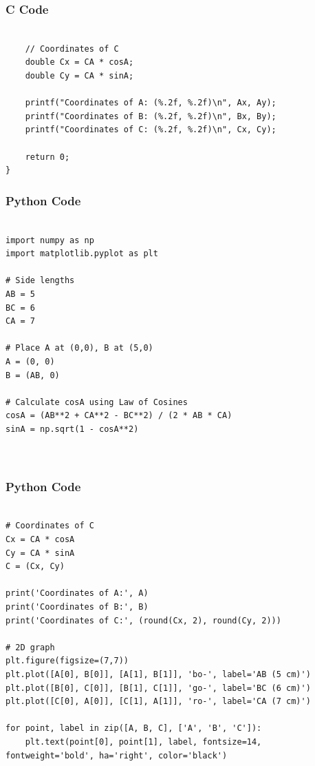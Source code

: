 \documentclass{beamer}
\begin{document}
\begin{frame}[fragile]
    \frametitle{C Code}
    \begin{lstlisting}

    // Coordinates of C
    double Cx = CA * cosA;
    double Cy = CA * sinA;

    printf("Coordinates of A: (%.2f, %.2f)\n", Ax, Ay);
    printf("Coordinates of B: (%.2f, %.2f)\n", Bx, By);
    printf("Coordinates of C: (%.2f, %.2f)\n", Cx, Cy);

    return 0;
}

    \end{lstlisting}
\end{frame}







\begin{frame}[fragile]
    \frametitle{Python Code}
    \begin{lstlisting}

import numpy as np
import matplotlib.pyplot as plt

# Side lengths
AB = 5
BC = 6
CA = 7

# Place A at (0,0), B at (5,0)
A = (0, 0)
B = (AB, 0)

# Calculate cosA using Law of Cosines
cosA = (AB**2 + CA**2 - BC**2) / (2 * AB * CA)
sinA = np.sqrt(1 - cosA**2)



    \end{lstlisting}
\end{frame}


\begin{frame}[fragile]
    \frametitle{Python Code}
    \begin{lstlisting}

# Coordinates of C
Cx = CA * cosA
Cy = CA * sinA
C = (Cx, Cy)

print('Coordinates of A:', A)
print('Coordinates of B:', B)
print('Coordinates of C:', (round(Cx, 2), round(Cy, 2)))

# 2D graph
plt.figure(figsize=(7,7))
plt.plot([A[0], B[0]], [A[1], B[1]], 'bo-', label='AB (5 cm)')
plt.plot([B[0], C[0]], [B[1], C[1]], 'go-', label='BC (6 cm)')
plt.plot([C[0], A[0]], [C[1], A[1]], 'ro-', label='CA (7 cm)')

for point, label in zip([A, B, C], ['A', 'B', 'C']):
    plt.text(point[0], point[1], label, fontsize=14, fontweight='bold', ha='right', color='black')



    \end{lstlisting}
\end{frame}
\end{document}
